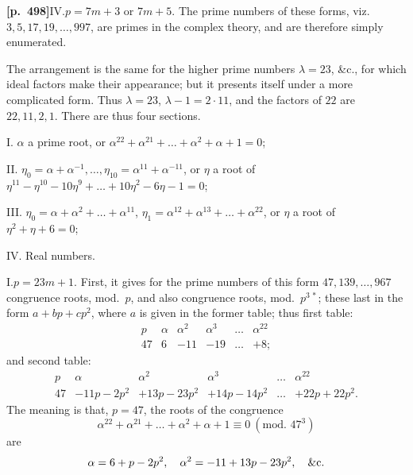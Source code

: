 \documentclass[11pt,a4paper]{article}
\begin{document}
\noindent\textbf{[p.~498]}\quad IV.\quad $p = 7m + 3$ or $7m + 5$. The prime numbers of these forms, viz.\ $3, 5, 17, 19, \ldots, 997$, are primes in the complex theory, and are therefore simply enumerated.

The arrangement is the same for the higher prime numbers $\lambda = 23$, \&c., for which ideal factors make their appearance; but it presents itself under a more complicated form. Thus $\lambda = 23$, $\lambda - 1 = 2 \cdot 11$, and the factors of $22$ are $22, 11, 2, 1$. There are thus four sections.

I. $\alpha$ a prime root, or $\alpha^{22} + \alpha^{21} + \ldots + \alpha^{2} + \alpha + 1 = 0$;

II. $\eta_{0} = \alpha + \alpha^{-1}, \ldots, \eta_{10} = \alpha^{11} + \alpha^{-11}$, or $\eta$ a root of $\eta^{11} - \eta^{10} - 10\eta^{9} + \ldots + 10\eta^{2} - 6\eta - 1 = 0$;

III. $\eta_{0} = \alpha + \alpha^{2} + \ldots + \alpha^{11}$, $\eta_{1} = \alpha^{12} + \alpha^{13} + \ldots + \alpha^{22}$, or $\eta$ a root of $\eta^{2} + \eta + 6 = 0$;

IV. Real numbers.

I.\quad $p = 23m + 1$. First, it gives for the prime numbers of this form $47, 139, \ldots, 967$ congruence roots, mod.~$p$, and also congruence roots, mod.~$p^{3\,*}$; these last in the form $a + bp + cp^{2}$, where $a$ is given in the former table; thus first table:
\[
\begin{array}{c|ccccc}
p & \alpha & \alpha^{2} & \alpha^{3} & \ldots & \alpha^{22} \\
\hline
47 & 6 & -11 & -19 & \ldots & +8;
\end{array}
\]
and second table:
\[
\begin{array}{c|cccc|c}
p & \alpha & \alpha^{2} & \alpha^{3} & \ldots & \alpha^{22} \\
\hline
47 & -11p - 2p^{2} & +13p - 23p^{2} & +14p - 14p^{2} & \ldots & +22p + 22p^{2}.
\end{array}
\]
The meaning is that, $p = 47$, the roots of the congruence
\[
\alpha^{22} + \alpha^{21} + \ldots + \alpha^{2} + \alpha + 1 \equiv 0\ (\text{mod.~}47^{3})
\]
are
\[
\alpha = 6 + p - 2p^{2},\quad \alpha^{2} = -11 + 13p - 23p^{2},\quad \&{\rm c.}
\]
\end{document}
